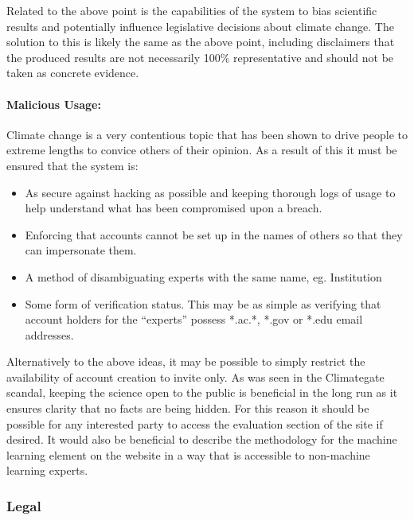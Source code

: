 \documentclass{ecmm427_assignment}
\begin{document}
 Related to the above point is the capabilities of the system to bias
scientific results and potentially influence legislative
decisions about climate change. The solution to this is likely the
same as the above point, including disclaimers that the produced results
are not necessarily 100\% representative and should not be taken as concrete evidence.

\paragraph{Malicious Usage:}

 Climate change is a very contentious topic that has been shown to
drive people to extreme lengths to convice others of their opinion\cite{nerlich2010climategate}. As a result
of this it must be ensured that the system is:
\begin{itemize}
\item As secure against hacking as possible and keeping thorough logs of
usage to help understand what has been compromised upon a breach.
\item Enforcing that accounts cannot be set up in the names of others so
that they can impersonate them. 
\item A method of disambiguating experts with the same name, eg. Institution
\item Some form of verification status. This may be as simple as verifying
that account holders for the ``experts'' possess {*}.ac.{*}, {*}.gov
or {*}.edu email addresses. 
\end{itemize}
 Alternatively to the above ideas, it may be possible to simply restrict
the availability of account creation to invite only. As was seen in
the Climategate scandal, keeping the science open to the public is
beneficial in the long run as it ensures clarity that no facts are
being hidden. For this reason it should be possible for any interested
party to access the evaluation section of the site if desired. It
would also be beneficial to describe the methodology for the machine learning
element on the website in a way that is accessible to non-machine
learning experts.

\subsubsection{Legal}
\end{document}

